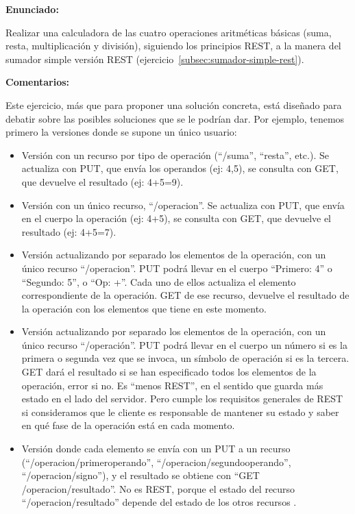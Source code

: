 \textbf{Enunciado:}

Realizar una calculadora de las cuatro operaciones aritméticas básicas (suma, resta, multiplicación y división), siguiendo los principios REST, a la manera del sumador simple versión REST (ejercicio~\ref{subsec:sumador-simple-rest}).

\textbf{Comentarios:}

Este ejercicio, más que para proponer una solución concreta, está diseñado para debatir sobre las posibles soluciones que se le podrían dar. Por ejemplo, tenemos primero la versiones donde se supone un único usuario:

\begin{itemize}
\item Versión con un recurso por tipo de operación (``/suma'', ``resta'', etc.). Se actualiza con PUT, que envía los operandos (ej: 4,5), se consulta con GET, que devuelve el resultado (ej: 4+5=9).
\item Versión con un único recurso, ``/operacion''. Se actualiza con PUT, que envía en el cuerpo la operación (ej: 4+5), se consulta con GET, que devuelve el resultado (ej: 4+5=7).
\item Versión actualizando por separado los elementos de la operación, con un único recurso ``/operacion''. PUT podrá llevar en el cuerpo ``Primero: 4'' o ``Segundo: 5'', o ``Op: +''. Cada uno de ellos actualiza el elemento correspondiente de la operación. GET de ese recurso, devuelve el resultado de la operación con los elementos que tiene en este momento.
\item Versión actualizando por separado los elementos de la operación, con un único recurso ``/operación''. PUT podrá llevar en el cuerpo un número si es la primera o segunda vez que se invoca, un símbolo de operación si es la tercera. GET dará el resultado si se han especificado todos los elementos de la operación, error si no. Es ``menos REST'', en el sentido que guarda más estado en el lado del servidor. Pero cumple los requisitos generales de REST si consideramos que le cliente es responsable de mantener su estado y saber en qué fase de la operación está en cada momento.
\item Versión donde cada elemento se envía con un PUT a un recurso (``/operacion/primeroperando'', ``/operacion/segundooperando'', ``/operacion/signo''), y el resultado se obtiene con ``GET /operacion/resultado''. No es REST, porque el estado del recurso ``/operacion/resultado'' depende del estado de los otros recursos
.
\end{itemize}

